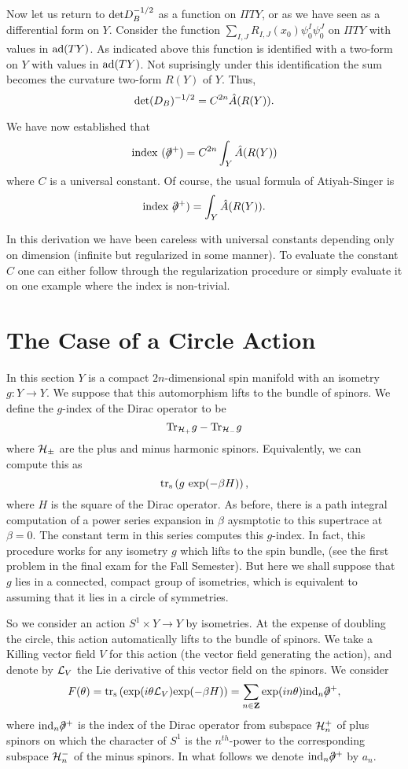 Now let us return to ${\rm det}D_B^{-1/2}$ as a function on $\Pi TY$,
or as we have seen as a differential form on $Y$. Consider  the
function $\sum_{I,J}R_{I,J}(x_0)\psi_0^I\psi_0^J$ on $\Pi TY$ with values in
${\rm ad}(TY)$. As indicated above this function is identified with a
two-form on $Y$ with values in ${\rm ad}(TY)$. Not suprisingly 
under this identification the sum becomes the curvature two-form $R(Y)$
of $Y$.
Thus, 
$${\rm det}(D_B)^{-1/2}=C^{2n}\hat A(R(Y)).$$



We have now established that 
$${\rm index}\ (\dirac^+)=C^{2n}\int_Y
\hat A(R(Y))$$
where $C$ is a  universal constant.
Of course, the usual formula of Atiyah-Singer is
$${\rm index}\ \dirac^+)=\int_Y\hat A(R(Y)).$$



In this derivation we have been careless with universal constants
depending only on dimension
(infinite but regularized in some manner).
To evaluate the constant $C$ one can either follow through the
regularization procedure or simply evaluate it on one example where
the index is non-trivial.

\section{The Case of a Circle Action}

In this section $Y$ is a compact $2n$-dimensional spin manifold with
an isometry 
$g\colon Y\to Y$. We suppose that this automorphism lifts to
the bundle of spinors. We define the $g$-index of
the Dirac operator to be
$${\rm Tr}_{{\cal H}_+}g-{\rm Tr}_{{\cal H}_-}g$$
where ${\cal H}_{\pm}$ are the plus and minus harmonic spinors.
Equivalently, we can compute this  as 
$${\rm tr_s}\left(g\ {\rm exp}(-\beta H)\right),$$
where $H$ is the square of the Dirac operator.
As before, there is a path integral computation of a power series
expansion in $\beta$ 
aysmptotic to this supertrace at $\beta=0$.
The constant term in this series computes
this $g$-index.
In fact, this procedure works for any isometry $g$ which lifts to the
spin bundle, (see the first problem in the final exam for the Fall
Semester).  But here we shall suppose that $g$ lies in a connected,
compact 
group of isometries, which is equivalent to assuming that it lies in a
circle of symmetries.

So we consider an action $S^1\times Y\to Y$ by isometries. At the
expense of doubling the circle, this action
automatically lifts to the bundle of spinors.
We take a Killing vector field $V$ for this action (the vector field
generating the action), and denote by ${\cal L}_V$ the Lie derivative
of this vector field on the spinors.  We consider 
$$F(\theta)={\rm tr_s}\left({\rm exp}(i\theta{\cal L}_V){\rm exp}(-\beta
H)\right)=\sum_{n\in {\bf Z}}{\rm exp}(in\theta){\rm ind}_n\dirac^+,$$  
where ${\rm ind}_n\dirac^+$ is the index of the Dirac operator from
subspace ${\cal H}_n^+$ of plus spinors on which the character of
$S^1$ is the 
$n^{th}$-power to the corresponding subspace ${\cal H}_n^-$ of the
minus spinors. 
In what follows we denote ${\rm ind}_n\dirac^+$ by $a_n$.

